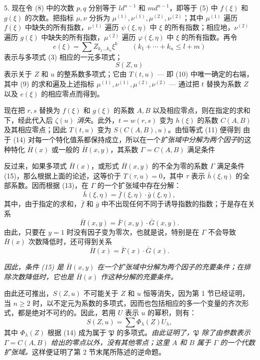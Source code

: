 5. 现在令 (8) 中的次数 $p,q$ 分别等于 $ld^{n-1}$ 和 $md^{n-1}$，即等于 (5) 中 $f(\xi)$ 和 $g(\xi)$ 的次数。把指标 $\mu,\nu$ 分拆为 $\mu^{(1)},\nu^{(1)},\mu^{(2)},\nu^{(2)}$；其中 $\mu^{(1)}$ 遍历 $f(\xi)$ 中缺失的所有指数，$\nu^{(1)}$ 遍历 $\psi(\xi,\eta)$ 中 $\xi$ 的所有指数；相应地，$\nu^{(2)}$ 遍历 $g(\xi)$ 中缺失的所有指数，$\mu^{(2)}$ 遍历 $\varphi(\xi,\eta)$ 中 $\xi$ 的所有指数。再令
\[
 e(\xi)=\sum Z_{k_1\ldots k_n}\xi^k\qquad(k_1+\cdots+k_n\le l+m)
\]
表示与多项式 (3) 相应的一元多项式；
\[
 S(Z,u)
\]
表示关于 $Z$ 和 $u$ 的整系数多项式；它由 $T(t,u)$ --- 即 (10) 中唯一确定的右端，其中 (9) 的求和遍及上述指标 $\mu^{(1)},\nu^{(1)},\mu^{(2)},\nu^{(2)}$ --- 通过把 $t$ 替换为系数 $Z$ 以及 $e(\xi)$ 的相应零点而得到。

现在把 $r,s$ 替换为 $f(\xi)$ 和 $g(\xi)$ 的系数 $A,B$ 以及相应零点，则在指定的求和下，经此代入后 $\zeta(u)$ \emph{消失}。此外，$t=w(r,s)$ 变为 $h(\xi)$ 的系数 $C(A,B)$ 及其相应零点；因此 $T(t,u)$ 变为 $S(C(A,B),u)$。由恒等式 (11) 便得到
由于 (14) 对每一个特化值系都保持成立，所以在一个\emph{扩张域中分解为两个因子}的这种特化 $\bar H(x)$ 或一般的 $\bar H(x,y)$，其系数 $\Gamma=C(A,B)$ 满足条件

反过来，如果多项式 $\bar H(x)$，或形式 $\bar H(x,y)$ 的不全为零的系数 $\Gamma$ 满足条件 (15)，那么根据上面的论述，这等价于 $T(\tau,u)=0$，其中 $\tau$ 表示 $\bar h(\xi,\eta)$ 的全部系数。因而根据 (13)，在 $\Gamma$ 的一个扩张域中存在分解：
\[
 \bar h(\xi,\eta)=\bar f(\xi,\eta)\cdot\bar g(\xi,\eta),
\]
其中，由于指定的求和，$\bar f$ 和 $\bar g$ 中不出现任何不同于诱导指数的指数；于是存在关系
\[
 \bar H(x,y)=\bar F(x,y)\cdot\bar G(x,y).
\]
由此，只要在 $y=1$ 时没有因子变为零次，也就是说，特别是在 $\Gamma$ 不会导致 $\bar H(x)$ 次数降低时，还可得到关系
\[
 \bar H(x)=\bar F(x)\cdot\bar G(x).
\]

\emph{因此，条件 (15) 是 $\bar H(x,y)$ 在一个扩张域中分解为两个因子的充要条件；在排除次数降低时，它也是 $\bar H(x)$ 作这种分解的充要条件。}

由此还可推出，$S(Z,u)$ 不可能关于 $Z$ 和 $u$ 恒等消失，因为第 1 节已经证明，当 $n\ge2$ 时，以不定元为系数的多项式，因而也包括相应的多一个变量的齐次形式，都是绝对不可约的。因此，若用 $U$ 表示 $u$ 的幂积，则有：
\[
S(Z,u)=\sum \Phi_\lambda(Z)U_\lambda,
\]
其中 $\Phi_\lambda(Z)$ 根据 (14) 成为属于 $\mathfrak P$ 的多项式。\emph{由此证明了，$\mathfrak P$ 除了由参数表示 $\Gamma=C(A,B)$ 给出的零点以外，没有其他零点；这里 $A$ 和 $B$ 属于 $\Gamma$ 的一个代数扩张域。}这样便证明了第 2 节末尾所陈述的逆命题。


